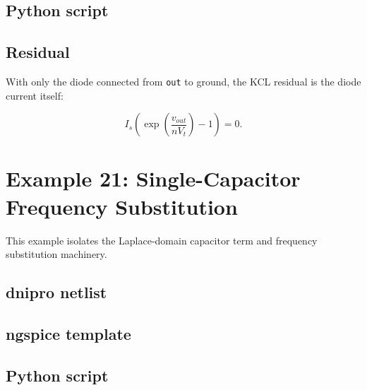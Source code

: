 \documentclass[11pt,a4paper]{article}
\newcommand{\code}[1]{\texttt{#1}}
\begin{document}


\subsection{Python script}



\subsection{Residual}

With only the diode connected from \code{out} to ground, the KCL residual is the
diode current itself:

\begin{equation}
    I_s\left(\exp\!\left(\frac{v_{out}}{nV_t}\right)-1\right)=0.
\end{equation}

\section{Example 21: Single-Capacitor Frequency Substitution}
\label{sec:ex-single-cap-frequency}

This example isolates the Laplace-domain capacitor term and frequency
substitution machinery.

\subsection{dnipro netlist}



\subsection{ngspice template}



\subsection{Python script}


\end{document}
